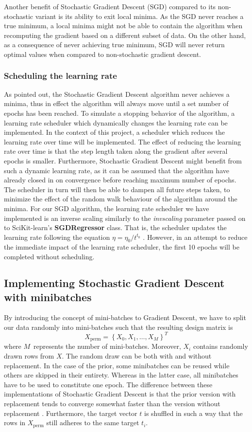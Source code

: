\documentclass
[twocolumn,
secnumarabic,
nobibnotes,
aps,
prl,
reprint,
groupedaddress,
amsmath,
amssymb
]{revtex4-2}
\begin{document}
Another benefit of Stochastic Gradient Descent (SGD) compared to its non-stochastic variant is its ability to exit local minima. As the SGD never reaches a true minimum, a local minima might not be able to contain the algorithm when recomputing the gradient based on a different subset of data. On the other hand, as a consequence of never achieving true minimum, SGD will never return optimal values when compared to non-stochastic gradient descent.

\subsubsection{Scheduling the learning rate}
As pointed out, the Stochastic Gradient Descent algorithm never achieves a minima, thus in effect the algorithm will always move until a set number of epochs has been reached. To simulate a stopping behavior of the algorithm, a learning rate scheduler which dynamically changes the learning rate can be implemented. In the context of this project, a scheduler which reduces the learning rate over time will be implemented.
The effect of reducing the learning rate over time is that the step length taken along the gradient after several epochs is smaller. Furthermore, Stochastic Gradient Descent might benefit from such a dynamic learning rate, as it can  be assumed that the algorithm have already closed in on convergence before reaching maximum number of epochs. The scheduler in turn will then be able to dampen all future steps taken, to minimize the effect of the random walk behaviour of the algorithm around the minima.
For our SGD algorithm, the learning rate scheduler we have implemented is an inverse scaling similarly to the \textit{invscaling} parameter passed on to SciKit-learn's \textbf{SGDRegressor} class. That is, the scheduler updates the learning rate following the equation $\eta = \eta_0/t^{t_0}$ \cite{scikit-learn}. However, in an attempt to reduce the immediate impact of the learning rate scheduler, the first 10 epochs will be completed without scheduling.

\subsection{Implementing Stochastic Gradient Descent with minibatches}
By introducing the concept of mini-batches to Gradient Descent, we have to split our data randomly into mini-batches such that the resulting design matrix is
$$
  X_{\text{perm}} = \left\{X_0, X_1, \ldots, X_M\right\}^T
$$
where $M$ represents the number of mini-batches. Moreover, $X_i$ contains randomly drawn rows from $X$. The random draw can be both with and without replacement. In the case of the prior, some minibatches can be reused while others are skipped in their entirety. Whereas in the latter case, all minibatches have to be used to constitute one epoch. The difference between these implementations of Stochastic Gradient Descent is that the prior version with replacement tends to converge somewhat faster than the version without replacement \cite{Geron2019}. Furthermore, the target vector $t$ is shuffled in such a way that the rows in $X_{\text{perm}}$ still adheres to the same target $t_i$.
\end{document}
